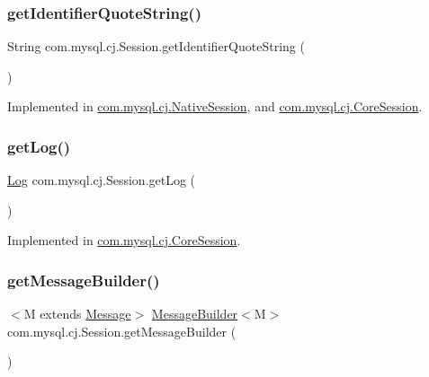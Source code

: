 \subsubsection{\texorpdfstring{get\+Identifier\+Quote\+String()}{getIdentifierQuoteString()}}
{\footnotesize\ttfamily String com.\+mysql.\+cj.\+Session.\+get\+Identifier\+Quote\+String (\begin{DoxyParamCaption}{ }\end{DoxyParamCaption})}



Implemented in \mbox{\hyperlink{classcom_1_1mysql_1_1cj_1_1_native_session_af85c1c114ea3ef2ab2d588cd178512cf}{com.\+mysql.\+cj.\+Native\+Session}}, and \mbox{\hyperlink{classcom_1_1mysql_1_1cj_1_1_core_session_aaefdfad2df641e33d77e2b53f855afbd}{com.\+mysql.\+cj.\+Core\+Session}}.

\mbox{\label{interfacecom_1_1mysql_1_1cj_1_1_session_a25f2c23d8ac5ae3e87491a66aabddceb}} 
\subsubsection{\texorpdfstring{get\+Log()}{getLog()}}
{\footnotesize\ttfamily \mbox{\hyperlink{interfacecom_1_1mysql_1_1cj_1_1log_1_1_log}{Log}} com.\+mysql.\+cj.\+Session.\+get\+Log (\begin{DoxyParamCaption}{ }\end{DoxyParamCaption})}



Implemented in \mbox{\hyperlink{classcom_1_1mysql_1_1cj_1_1_core_session_ae6ee08b5d613e57d0f9e16f037ecb6cf}{com.\+mysql.\+cj.\+Core\+Session}}.

\mbox{\label{interfacecom_1_1mysql_1_1cj_1_1_session_ab2182c03050810ec8fa253a912c72e10}} 
\subsubsection{\texorpdfstring{get\+Message\+Builder()}{getMessageBuilder()}}
{\footnotesize\ttfamily $<$M extends \mbox{\hyperlink{interfacecom_1_1mysql_1_1cj_1_1protocol_1_1_message}{Message}}$>$ \mbox{\hyperlink{interfacecom_1_1mysql_1_1cj_1_1_message_builder}{Message\+Builder}}$<$M$>$ com.\+mysql.\+cj.\+Session.\+get\+Message\+Builder (\begin{DoxyParamCaption}{ }\end{DoxyParamCaption})}


